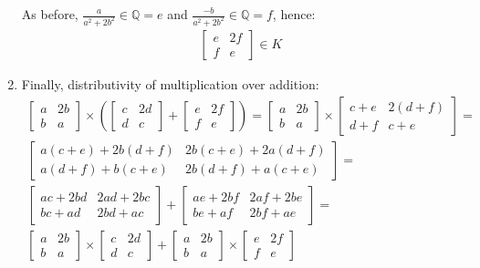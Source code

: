\documentclass[11pt]{article}
\begin{document}
\begin{enumerate}
As before, $\frac{a}{a^2 + 2b^2} \in \mathbb{Q} = e$ and $\frac{-b}{a^2 +
        2b^2} \in \mathbb{Q} = f$, hence:
\begin{align*}
  \begin{bmatrix}
    e & 2f \\
    f & e
  \end{bmatrix} \in K
\end{align*}

\item Finally, distributivity of multiplication over addition:
\begin{align*}
  \begin{bmatrix}
    a & 2b \\
    b & a
  \end{bmatrix} \times 
  \left(\begin{bmatrix}
    c & 2d \\
    d & c
  \end{bmatrix} + 
  \begin{bmatrix}
    e & 2f \\
    f & e
  \end{bmatrix}\right) =
  \begin{bmatrix}
    a & 2b \\
    b & a
  \end{bmatrix} \times 
  \begin{bmatrix}
    c + e & 2(d + f) \\
    d + f & c + e 
  \end{bmatrix} = \\
  \begin{bmatrix}
    a(c + e) + 2b(d + f) & 2b(c + e) + 2a(d + f) \\
    a(d + f) + b(c + e)  & 2b(d + f) + a(c + e)
  \end{bmatrix} = \\
  \begin{bmatrix}
    ac + 2bd & 2ad + 2bc \\
    bc + ad & 2bd + ac
  \end{bmatrix} + 
  \begin{bmatrix}
    ae + 2bf & 2af + 2be \\
    be + af & 2bf + ae
  \end{bmatrix} = \\  
  \begin{bmatrix}
    a & 2b \\
    b & a
  \end{bmatrix} \times 
  \begin{bmatrix}
    c & 2d \\
    d & c
  \end{bmatrix} + 
  \begin{bmatrix}
    a & 2b \\
    b & a
  \end{bmatrix} \times 
  \begin{bmatrix}
    e & 2f \\
    f & e
  \end{bmatrix}
\end{align*}
\end{enumerate}
\end{document}
